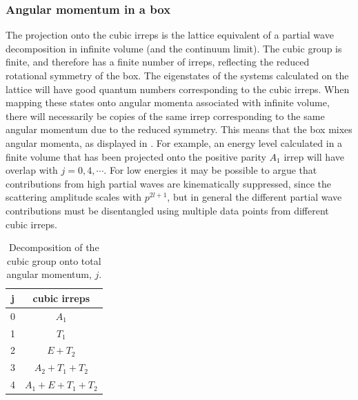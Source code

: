 \subsubsection{Angular momentum in a box}

The projection onto the cubic irreps is the lattice equivalent of a partial wave decomposition in infinite volume (and the continuum limit). The cubic group is finite, and therefore has a finite number of irreps, reflecting the reduced rotational symmetry of the box. The eigenstates of the systems calculated on the lattice will have good quantum numbers corresponding to the cubic irreps. When mapping these states onto angular momenta associated with infinite volume, there will necessarily be copies of the same irrep corresponding to the same angular momentum due to the reduced symmetry. This means that the box mixes angular momenta, as displayed in . For example, an energy level calculated in a finite volume that has been projected onto the positive parity $A_1$ irrep will have overlap with $j=0,4,\cdots$. For low energies it may be possible to argue that contributions from high partial waves are kinematically suppressed, since the scattering amplitude scales with $p^{2l+1}$, but in general the different partial wave contributions must be disentangled using multiple data points from different cubic irreps. 

\begin{table}[h!]
\label{tab:cubicirreps}
\begin{tabular}{cc}
 j \hspace{1mm} & cubic irreps \\
 \hline
 0  \hspace{1mm}& $A_1$ \\
 1 \hspace{1mm} & $T_1$ \\
 2 \hspace{1mm} & $E+T_2$ \\
 3 \hspace{1mm} & $A_2 + T_1 + T_2$ \\
 4 \hspace{1mm} & $A_1 + E + T_1 + T_2$ \\
 \end{tabular}
 \caption{Decomposition of the cubic group onto total angular momentum, $j$.}
 \end{table}
 

